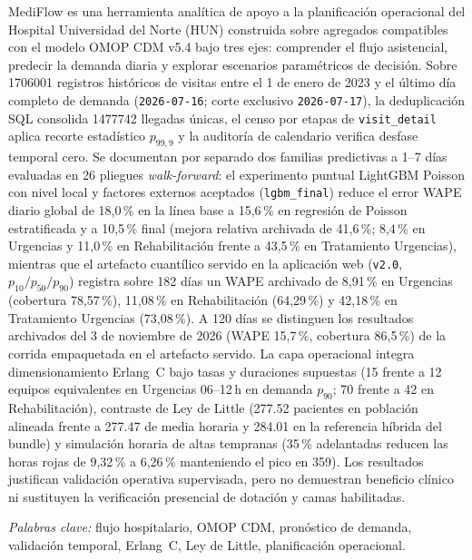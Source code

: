 \noindent MediFlow es una herramienta analítica de apoyo a la planificación operacional del Hospital Universidad del Norte (HUN) construida sobre agregados compatibles con el modelo OMOP CDM v5.4 bajo tres ejes: comprender el flujo asistencial, predecir la demanda diaria y explorar escenarios paramétricos de decisión. Sobre \num{1706001} registros históricos de visitas entre el 1 de enero de 2023 y el último día completo de demanda (\texttt{2026-07-16}; corte exclusivo \texttt{2026-07-17}), la deduplicación SQL consolida \num{1477742} llegadas únicas, el censo por etapas de \texttt{visit\_detail} aplica recorte estadístico $p_{99{,}9}$ y la auditoría de calendario verifica desfase temporal cero. Se documentan por separado dos familias predictivas a 1--7 días evaluadas en 26 pliegues \textit{walk-forward}: el experimento puntual LightGBM Poisson con nivel local y factores externos aceptados (\texttt{lgbm\_final}) reduce el error WAPE diario global de 18,0\,\% en la línea base a 15,6\,\% en regresión de Poisson estratificada y a 10,5\,\% final (mejora relativa archivada de 41,6\,\%; 8,4\,\% en Urgencias y 11,0\,\% en Rehabilitación frente a 43,5\,\% en Tratamiento Urgencias), mientras que el artefacto cuantílico servido en la aplicación web (\texttt{v2.0}, $p_{10}/p_{50}/p_{90}$) registra sobre 182 días un WAPE archivado de 8,91\,\% en Urgencias (cobertura 78,57\,\%), 11,08\,\% en Rehabilitación (64,29\,\%) y 42,18\,\% en Tratamiento Urgencias (73,08\,\%). A 120 días se distinguen los resultados archivados del 3 de noviembre de 2026 (WAPE 15,7\,\%, cobertura 86,5\,\%) de la corrida empaquetada en el artefacto servido. La capa operacional integra dimensionamiento Erlang~C bajo tasas y duraciones supuestas (15 frente a 12 equipos equivalentes en Urgencias 06--12\,h en demanda $p_{90}$; 70 frente a 42 en Rehabilitación), contraste de Ley de Little (\num{277,52} pacientes en población alineada frente a \num{277,47} de media horaria y \num{284,01} en la referencia híbrida del bundle) y simulación horaria de altas tempranas (35\,\% adelantadas reducen las horas rojas de 9,32\,\% a 6,26\,\% manteniendo el pico en 359). Los resultados justifican validación operativa supervisada, pero no demuestran beneficio clínico ni sustituyen la verificación presencial de dotación y camas habilitadas.

\indent\textit{Palabras clave:} flujo hospitalario, OMOP CDM, pronóstico de demanda, validación temporal, Erlang~C, Ley de Little, planificación operacional.

\clearpage
